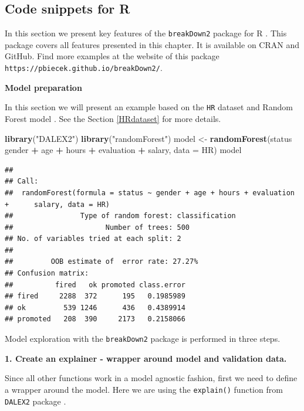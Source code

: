 \documentclass[]{krantz}
\newenvironment{Shaded}{\begin{snugshade}}{\end{snugshade}}
\newcommand{\DataTypeTok}[1]{\textcolor[rgb]{0.13,0.29,0.53}{#1}}
\newcommand{\KeywordTok}[1]{\textcolor[rgb]{0.13,0.29,0.53}{\textbf{#1}}}
\newcommand{\NormalTok}[1]{#1}
\newcommand{\OperatorTok}[1]{\textcolor[rgb]{0.81,0.36,0.00}{\textbf{#1}}}
\newcommand{\StringTok}[1]{\textcolor[rgb]{0.31,0.60,0.02}{#1}}
\theoremstyle{definition}
\theoremstyle{definition}
\theoremstyle{definition}
\theoremstyle{remark}
\begin{document}
\hypertarget{code-snippets-for-r}{%
\subsection{Code snippets for R}\label{code-snippets-for-r}}

In this section we present key features of the \texttt{breakDown2}
package for R \citep{R-breakDown}. This package covers all features
presented in this chapter. It is available on CRAN and GitHub. Find more
examples at the website of this package
\texttt{https://pbiecek.github.io/breakDown2/}.

\textbf{Model preparation}

In this section we will present an example based on the \texttt{HR}
dataset and Random Forest model \citep{R-randomForest}. See the Section
\ref{HRdataset} for more details.

\begin{Shaded}
\begin{Highlighting}[]
\KeywordTok{library}\NormalTok{(}\StringTok{"DALEX2"}\NormalTok{)}
\KeywordTok{library}\NormalTok{(}\StringTok{"randomForest"}\NormalTok{)}
\NormalTok{model <-}\StringTok{ }\KeywordTok{randomForest}\NormalTok{(status }\OperatorTok{~}\StringTok{ }\NormalTok{gender }\OperatorTok{+}\StringTok{ }\NormalTok{age }\OperatorTok{+}\StringTok{ }\NormalTok{hours }\OperatorTok{+}\StringTok{ }\NormalTok{evaluation }\OperatorTok{+}\StringTok{ }\NormalTok{salary, }\DataTypeTok{data =}\NormalTok{ HR)}
\NormalTok{model}
\end{Highlighting}
\end{Shaded}

\begin{verbatim}
## 
## Call:
##  randomForest(formula = status ~ gender + age + hours + evaluation +      salary, data = HR) 
##                Type of random forest: classification
##                      Number of trees: 500
## No. of variables tried at each split: 2
## 
##         OOB estimate of  error rate: 27.27%
## Confusion matrix:
##          fired   ok promoted class.error
## fired     2288  372      195   0.1985989
## ok         539 1246      436   0.4389914
## promoted   208  390     2173   0.2158066
\end{verbatim}

Model exploration with the \texttt{breakDown2} package is performed in
three steps.

\textbf{1. Create an explainer - wrapper around model and validation
data.}

Since all other functions work in a model agnostic fashion, first we
need to define a wrapper around the model. Here we are using the
\texttt{explain()} function from \texttt{DALEX2} package
\citep{R-DALEX}.
\end{document}
